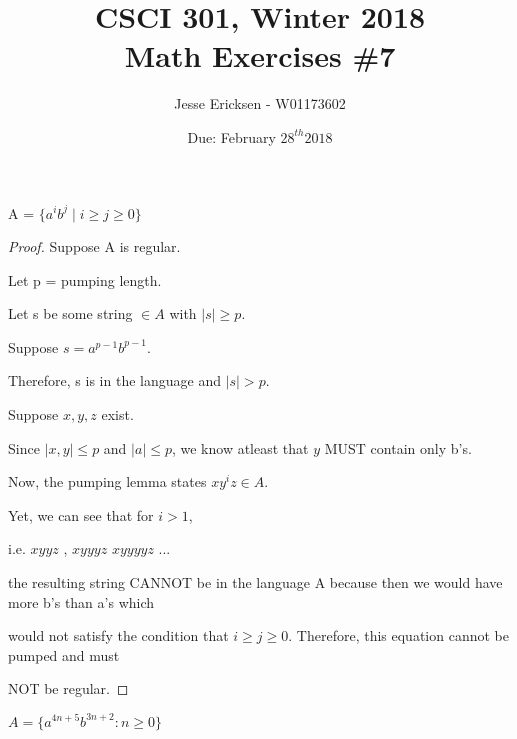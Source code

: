 \documentclass[10pt]{article}
\newenvironment{problem}[2][Problem]{\begin{trivlist}
\item[\hskip \labelsep {\bfseries #1}\hskip \labelsep {\bfseries #2.}]}{\end{trivlist}}
\begin{document}
 
\title{CSCI 301, Winter 2018\\Math Exercises \#7}
\author{Jesse Ericksen - W01173602}
\date{Due: February $28^{th} 2018$}
\maketitle
 
\begin{problem}{1}
A = $\{a^ib^j\mid i \geq j \geq 0\}$
\end{problem}
 
\begin{proof}[Proof]

Suppose A is regular. \newline

Let p = pumping length. 

Let s be some string $\in A$ with $|s| \geq p$. \newline

Suppose $s = a^{p-1} b^{p-1}$. 

Therefore, s is in the language and $|s| > p$.\newline

Suppose $x,y,z$ exist. \newline


Since $|x,y| \leq p$ and $|a| \leq p$, we know atleast that $y$ MUST contain only b's.
\newline

Now, the pumping lemma states $xy^iz \in A$. 

Yet, we can see that for $i > 1$, 

\begin{center}
i.e. $xyyz$ , $xyyyz$ $xyyyyz$ ...
\end{center}

the resulting string CANNOT be in the language A because then we would have more b's than a's which 

would not satisfy the condition that $ i \geq j \geq 0 $. Therefore, this equation cannot be pumped and must 

NOT be regular.

\end{proof}

\begin{problem}{2}
 $A = \{a^{4n+5}b^{3n+2}: n\geq 0\}$
\end{problem}
\end{document}
